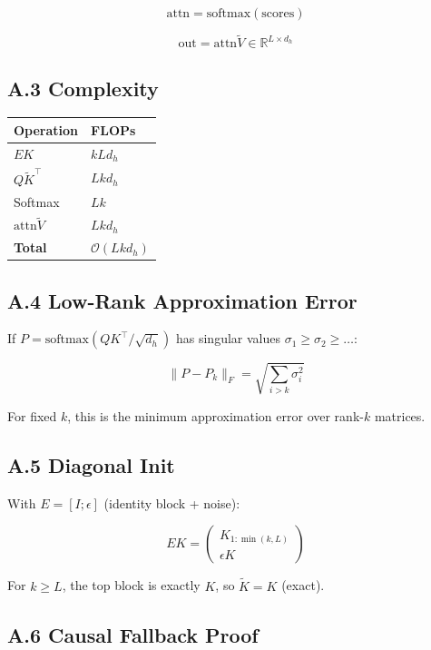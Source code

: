 \[
\text{attn} = \text{softmax}(\text{scores})
\tag{A.3}
\]

\[
\text{out} = \text{attn} \tilde{V} \in \mathbb{R}^{L \times d_h}
\tag{A.4}
\]

\subsection{A.3 Complexity}

\begin{table}[H]
\centering
\small
\begin{tabular}{ll}
\toprule
\textbf{Operation} & \textbf{FLOPs} \\
\midrule
$E K$ & $k L d_h$ \\
$Q \tilde{K}^\top$ & $L k d_h$ \\
Softmax & $L k$ \\
$\text{attn} \tilde{V}$ & $L k d_h$ \\
\textbf{Total} & $\mathcal{O}(L k d_h)$ \\
\bottomrule
\end{tabular}
\end{table}

\subsection{A.4 Low-Rank Approximation Error}

If $P = \text{softmax}(QK^\top/\sqrt{d_h})$ has singular values $\sigma_1 \geq \sigma_2 \geq \dots$:

\[
\|P - P_k\|_F = \sqrt{\sum_{i > k} \sigma_i^2}
\tag{A.5}
\]

For fixed $k$, this is the minimum approximation error over rank-$k$ matrices.

\subsection{A.5 Diagonal Init}

With $E = [I; \epsilon]$ (identity block + noise):

\[
E K = \begin{pmatrix} K_{1:\min(k,L)} \\ \epsilon K \end{pmatrix}
\tag{A.6}
\]

For $k \geq L$, the top block is exactly $K$, so $\tilde{K} = K$ (exact).

\subsection{A.6 Causal Fallback Proof}

